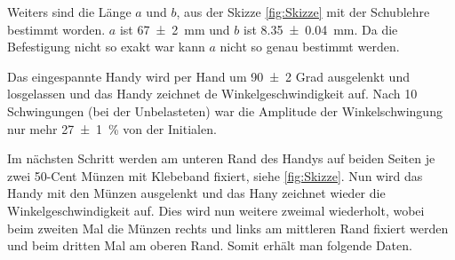 \documentclass[11pt,ngerman]{scrartcl}
\begin{document}
Weiters sind die Länge $a$ und $b$, aus der Skizze \ref{fig:Skizze} mit der
Schublehre bestimmt worden.  $a$ ist \SI{67(2)}{\mm} und $b$ ist
\SI{8.35(4)}{\mm}. Da die Befestigung nicht so exakt war kann $a$ nicht so
genau bestimmt werden. 

Das eingespannte Handy wird per Hand um \num{90(2)} Grad ausgelenkt und
losgelassen und das Handy zeichnet de Winkelgeschwindigkeit auf. Nach \num{10}
Schwingungen (bei der Unbelasteten) war die Amplitude der Winkelschwingung nur
mehr \SI{27(1)}{\percent} von der Initialen. 

Im nächsten Schritt werden am
unteren Rand des Handys auf beiden Seiten je zwei 50-Cent Münzen mit Klebeband
fixiert, siehe \autoref{fig:Skizze}. Nun wird das Handy mit den Münzen
ausgelenkt und das Hany zeichnet wieder die Winkelgeschwindigkeit auf.  Dies
wird nun weitere zweimal wiederholt, wobei beim zweiten Mal die Münzen rechts
und links am mittleren Rand fixiert werden und beim dritten Mal am oberen Rand.
Somit erhält man folgende Daten.
\end{document}
